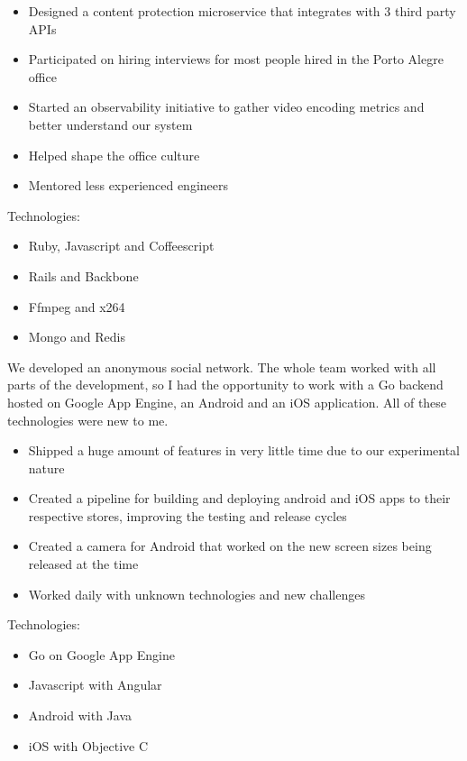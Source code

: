 \documentclass[10pt,a4paper,ragged2e,withhyper]{altacv}
\begin{document}
\begin{paracol}{2}
{\begin{itemize}
\item Designed a content protection microservice that integrates with 3 third party APIs
\item Participated on hiring interviews for most people hired in the Porto Alegre office
\item Started an observability initiative to gather video encoding metrics and better understand our system
\item Helped shape the office culture
\item Mentored less experienced engineers
\end{itemize}

Technologies:
\begin{itemize}
\item Ruby, Javascript and Coffeescript
\item Rails and Backbone
\item Ffmpeg and x264
\item Mongo and Redis
\end{itemize}
}

\divider


{\RaggedRight
We developed an anonymous social network. The whole team worked with all parts of the development, so I had the opportunity to work with a Go backend hosted on Google App Engine, an Android and an iOS application. All of these technologies were new to me.

\begin{itemize}
\item Shipped a huge amount of features in very little time due to our experimental nature
\item Created a pipeline for building and deploying android and iOS apps to their respective stores, improving the testing and release cycles
\item Created a camera for Android that worked on the new screen sizes being released at the time
\item Worked daily with unknown technologies and new challenges
\end{itemize}

Technologies:
\begin{itemize}
\item Go on Google App Engine
\item Javascript with Angular
\item Android with Java
\item iOS with Objective C
\end{itemize}
}


\end{paracol}
\end{document}
